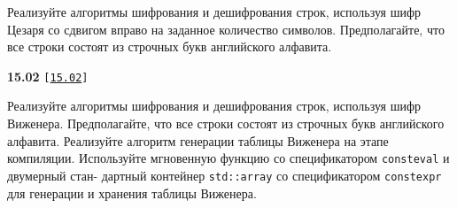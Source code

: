 \documentclass[a4paper,12pt]{article}
\begin{document}
\bigskip

Реализуйте алгоритмы шифрования и дешифрования строк, используя шифр Цезаря со сдвигом вправо на заданное количество символов. Предполагайте, что все строки состоят из строчных букв английского алфавита.

\bigskip

{\large \textbf{15.02} \texttt{[\href{https://github.com/i-s-m-mipt/Education/blob/master/projects/examples/source/15.02.cpp}{\texttt{15.02}}]}}

\bigskip

Реализуйте алгоритмы шифрования и дешифрования строк, используя шифр Виженера. Предполагайте, что все строки состоят из строчных букв английского алфавита. Реализуйте алгоритм генерации таблицы Виженера на этапе компиляции. Используйте мгновенную функцию со спецификатором \lstinline{consteval} и двумерный стан- дартный контейнер \lstinline{std::array} со спецификатором \lstinline{constexpr} для генерации и хранения таблицы Виженера.  
\end{document}
